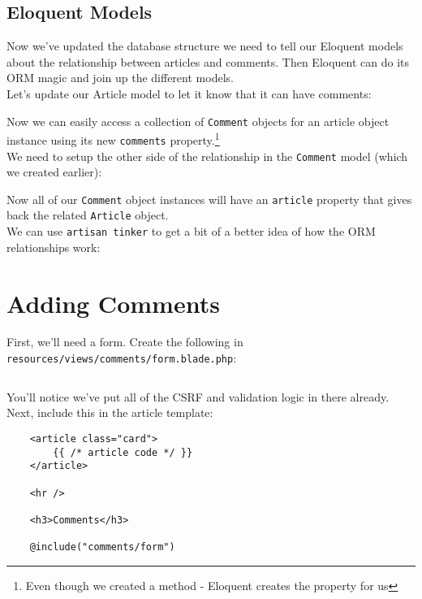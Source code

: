 \subsection{Eloquent Models}

Now we've updated the database structure we need to tell our Eloquent models about the relationship between articles and comments. Then Eloquent can do its ORM magic and join up the different models.
\\

Let's update our Article model to let it know that it can have comments:


Now we can easily access a collection of \texttt{Comment} objects for an article object instance using its new \texttt{comments} property.\footnote{Even though we created a method - Eloquent creates the property for us}
\\

We need to setup the other side of the relationship in the \texttt{Comment} model (which we created earlier):


Now all of our \texttt{Comment} object instances will have an \texttt{article} property that gives back the related \texttt{Article} object.
\\

We can use \texttt{artisan tinker} to get a bit of a better idea of how the ORM relationships work:



\section{Adding Comments}

First, we'll need a form. Create the following in \\ \texttt{resources/views/comments/form.blade.php}:

\inputminted{html}{11-one-to-many/figures/comments-form.blade.php}

You'll notice we've put all of the CSRF and validation logic in there already.
\\

Next, include this in the article template:

\begin{verbatim}
    <article class="card">
        {{ /* article code */ }}
    </article>

    <hr />

    <h3>Comments</h3>

    @include("comments/form")
\end{verbatim}

